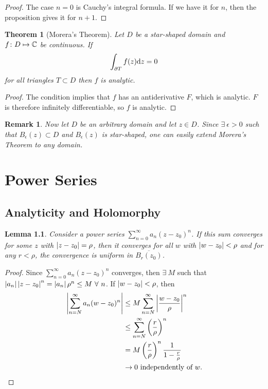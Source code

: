 \documentclass{notes}
\theoremstyle{plain}
\newtheorem{theorem}[proposition]{Theorem}
\newtheorem{lemma}[proposition]{Lemma}
\newtheorem*{remark}{Remark}
\begin{document}
\begin{proof}
The case $n=0$ is Cauchy's integral formula.  If we have it for $n$, then
the proposition gives it for $n+1$.
\end{proof}

\begin{theorem}[Morera's Theorem]
Let $D$ be a star-shaped domain and \\ $f \colon D \mapsto \mathbb{C}$ be continuous.
If
\[
\int_{\partial T} f(z) \mathrm{d} z = 0
\]
for all triangles $T \subset D$ then $f$ is analytic.
\end{theorem}

\begin{proof}
The condition implies that $f$ has an antiderivative $F$, which is analytic.
$F$ is therefore infinitely differentiable, so $f$ is analytic.
\end{proof}

\begin{remark}
Now let $D$ be an arbitrary domain and let $z \in D$.  Since $\exists\ \epsilon
> 0$ such that $B_\epsilon(z) \subset D$ and $B_\epsilon(z)$ is star-shaped,
one can easily extend Morera's Theorem to any domain.
\end{remark}

\chapter{Power Series}

\section{Analyticity and Holomorphy}

\begin{lemma}
Consider a power series $\sum_{n=0}^\infty a_n (z-z_0)^n$.  If this sum
converges for some $z$ with $\left|z-z_0\right| = \rho$, then it converges for all
$w$ with $\left|w-z_0\right| < \rho$ and for any $r < \rho$, the convergence is
uniform in $\overline{B_r(z_0)}$.
\end{lemma}

\begin{proof}
Since $\sum_{n=0}^\infty a_n (z-z_0)^n$ converges, then
$\exists\ M$ such that $\left|a_n\right|\left|z-z_0\right|^n = \left|a_n\right| \rho^n \le M\
\forall\ n$.  If $\left|w-z_0\right| < \rho$, then
\begin{align*}
\left|\sum_{n=N}^\infty a_n (w-z_0)^n\right| &\le
M \sum_{n=N}^\infty \left|\frac{w-z_0}{\rho}\right|^n \\
&\le \sum_{n=N}^\infty \left(\frac{r}{\rho}\right)^n \\
&= M \left( \frac{r}{\rho} \right)^n \frac{1}{1-\frac{r}{\rho}} \\
&\rightarrow 0 \text{ independently of $w$.}
\end{align*}
\end{proof}
\end{document}
